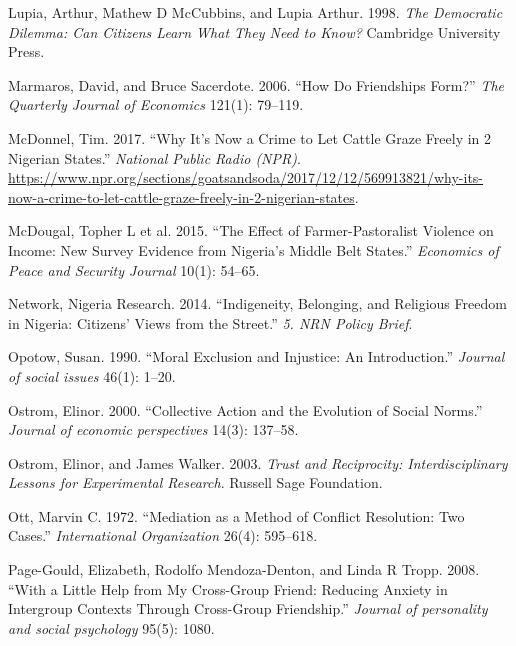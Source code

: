 \documentclass[11pt]{article}
\begin{document}
\leavevmode\hypertarget{ref-lupia1998democratic}{}%
Lupia, Arthur, Mathew D McCubbins, and Lupia Arthur. 1998. \emph{The
Democratic Dilemma: Can Citizens Learn What They Need to Know?}
Cambridge University Press.

\leavevmode\hypertarget{ref-marmaros2006friendships}{}%
Marmaros, David, and Bruce Sacerdote. 2006. ``How Do Friendships Form?''
\emph{The Quarterly Journal of Economics} 121(1): 79--119.

\leavevmode\hypertarget{ref-mcdonnel2017graze}{}%
McDonnel, Tim. 2017. ``Why It's Now a Crime to Let Cattle Graze Freely
in 2 Nigerian States.'' \emph{National Public Radio (NPR)}.
\url{https://www.npr.org/sections/goatsandsoda/2017/12/12/569913821/why-its-now-a-crime-to-let-cattle-graze-freely-in-2-nigerian-states}.

\leavevmode\hypertarget{ref-mcdougal2015effect}{}%
McDougal, Topher L et al. 2015. ``The Effect of Farmer-Pastoralist
Violence on Income: New Survey Evidence from Nigeria's Middle Belt
States.'' \emph{Economics of Peace and Security Journal} 10(1): 54--65.

\leavevmode\hypertarget{ref-nigeria2014freedom}{}%
Network, Nigeria Research. 2014. ``Indigeneity, Belonging, and Religious
Freedom in Nigeria: Citizens' Views from the Street.'' \emph{5. NRN
Policy Brief}.

\leavevmode\hypertarget{ref-opotow1990moral}{}%
Opotow, Susan. 1990. ``Moral Exclusion and Injustice: An Introduction.''
\emph{Journal of social issues} 46(1): 1--20.

\leavevmode\hypertarget{ref-ostrom2000collective}{}%
Ostrom, Elinor. 2000. ``Collective Action and the Evolution of Social
Norms.'' \emph{Journal of economic perspectives} 14(3): 137--58.

\leavevmode\hypertarget{ref-ostrom2003trust}{}%
Ostrom, Elinor, and James Walker. 2003. \emph{Trust and Reciprocity:
Interdisciplinary Lessons for Experimental Research}. Russell Sage
Foundation.

\leavevmode\hypertarget{ref-ott1972mediation}{}%
Ott, Marvin C. 1972. ``Mediation as a Method of Conflict Resolution: Two
Cases.'' \emph{International Organization} 26(4): 595--618.

\leavevmode\hypertarget{ref-page2008little}{}%
Page-Gould, Elizabeth, Rodolfo Mendoza-Denton, and Linda R Tropp. 2008.
``With a Little Help from My Cross-Group Friend: Reducing Anxiety in
Intergroup Contexts Through Cross-Group Friendship.'' \emph{Journal of
personality and social psychology} 95(5): 1080.
\end{document}
